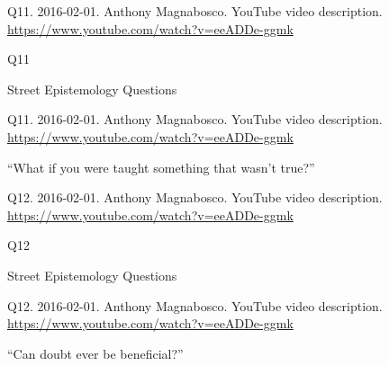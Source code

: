 \documentclass[
    src/templates/5x2-on-a4paper,
    frame
]{flashcards}
\newcommand{\myheader}{}
\newcommand{\myfooter}{
    \begin{flushright}
        \small\sc
        Street Epistemology Questions \par
    \end{flushright}
}
\begin{document}
        \renewcommand{\myheader}{
            \normalfont %
            \begin{tiny}
                Q11.
                2016-02-01.
                Anthony Magnabosco.
                    YouTube video description.
                    \\
                    \url{ https://www.youtube.com/watch?v=eeADDe-ggmk }
                \par
            \end{tiny}
        }
        \begin{flashcard}{
            \myheader
            \vspace{\fill}
            \begin{center}
                \large
                    Q11
            \end{center}
            \vspace{\fill}
            \myfooter
            \vspace{-1.4ex}
        }
            \myheader
            \vspace{\fill}
            \begin{center}
                \large
\enquote{What if you were taught something that wasn't true?}            \end{center}
            \vspace{\fill}
        \end{flashcard}
        \renewcommand{\myheader}{
            \normalfont %
            \begin{tiny}
                Q12.
                2016-02-01.
                Anthony Magnabosco.
                    YouTube video description.
                    \\
                    \url{ https://www.youtube.com/watch?v=eeADDe-ggmk }
                \par
            \end{tiny}
        }
        \begin{flashcard}{
            \myheader
            \vspace{\fill}
            \begin{center}
                \large
                    Q12
            \end{center}
            \vspace{\fill}
            \myfooter
            \vspace{-1.4ex}
        }
            \myheader
            \vspace{\fill}
            \begin{center}
                \large
\enquote{Can doubt ever be beneficial?}            \end{center}
            \vspace{\fill}
        \end{flashcard}
\end{document}
